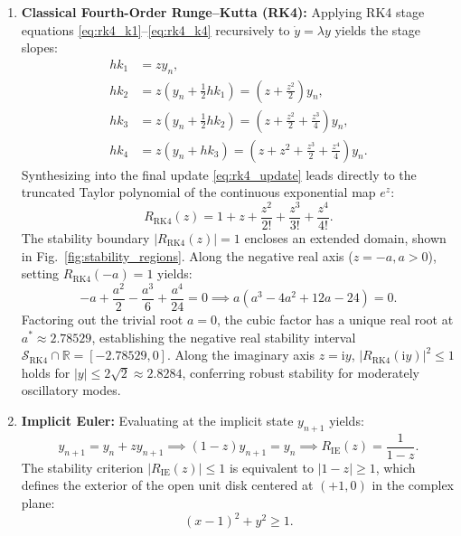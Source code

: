 \documentclass[11pt,a4paper]{article}
\theoremstyle{definition}
\theoremstyle{remark}
\begin{document}
\begin{enumerate}
    \item \textbf{Classical Fourth-Order Runge--Kutta (RK4):} Applying RK4 stage equations \eqref{eq:rk4_k1}--\eqref{eq:rk4_k4} recursively to $\dot{y} = \lambda y$ yields the stage slopes:
    \begin{align}
    h k_1 &= z y_n, \label{eq:rk4_stg1} \\
    h k_2 &= z \left( y_n + \frac{1}{2} h k_1 \right) = \left( z + \frac{z^2}{2} \right) y_n, \label{eq:rk4_stg2} \\
    h k_3 &= z \left( y_n + \frac{1}{2} h k_2 \right) = \left( z + \frac{z^2}{2} + \frac{z^3}{4} \right) y_n, \label{eq:rk4_stg3} \\
    h k_4 &= z \left( y_n + h k_3 \right) = \left( z + z^2 + \frac{z^3}{2} + \frac{z^4}{4} \right) y_n. \label{eq:rk4_stg4}
    \end{align}
    Synthesizing into the final update \eqref{eq:rk4_update} leads directly to the truncated Taylor polynomial of the continuous exponential map $e^z$:
    \begin{equation}
    \label{eq:R_RK4}
    R_{\mathrm{RK4}}(z) = 1 + z + \frac{z^2}{2!} + \frac{z^3}{3!} + \frac{z^4}{4!}.
    \end{equation}
    The stability boundary $|R_{\mathrm{RK4}}(z)| = 1$ encloses an extended domain, shown in Fig.~\ref{fig:stability_regions}. Along the negative real axis ($z = -a, a > 0$), setting $R_{\mathrm{RK4}}(-a) = 1$ yields:
    \begin{equation}
    \label{eq:rk4_real_root}
    -a + \frac{a^2}{2} - \frac{a^3}{6} + \frac{a^4}{24} = 0 \implies a\left(a^3 - 4a^2 + 12a - 24\right) = 0.
    \end{equation}
    Factoring out the trivial root $a = 0$, the cubic factor has a unique real root at $a^* \approx 2.78529$, establishing the negative real stability interval $\mathcal{S}_{\mathrm{RK4}} \cap \mathbb{R} = [-2.78529, 0]$. Along the imaginary axis $z = \mathrm{i}y$, $|R_{\mathrm{RK4}}(\mathrm{i}y)|^2 \le 1$ holds for $|y| \le 2\sqrt{2} \approx 2.8284$, conferring robust stability for moderately oscillatory modes.

    \item \textbf{Implicit Euler:} Evaluating at the implicit state $y_{n+1}$ yields:
    \begin{equation}
    \label{eq:R_IE}
    y_{n+1} = y_n + z y_{n+1} \implies (1 - z)y_{n+1} = y_n \implies R_{\mathrm{IE}}(z) = \frac{1}{1 - z}.
    \end{equation}
    The stability criterion $|R_{\mathrm{IE}}(z)| \le 1$ is equivalent to $|1 - z| \ge 1$, which defines the exterior of the open unit disk centered at $(+1, 0)$ in the complex plane:
    \begin{equation}
    \label{eq:IE_domain}
    (x - 1)^2 + y^2 \ge 1.
    \end{equation}
\end{enumerate}
\end{document}
